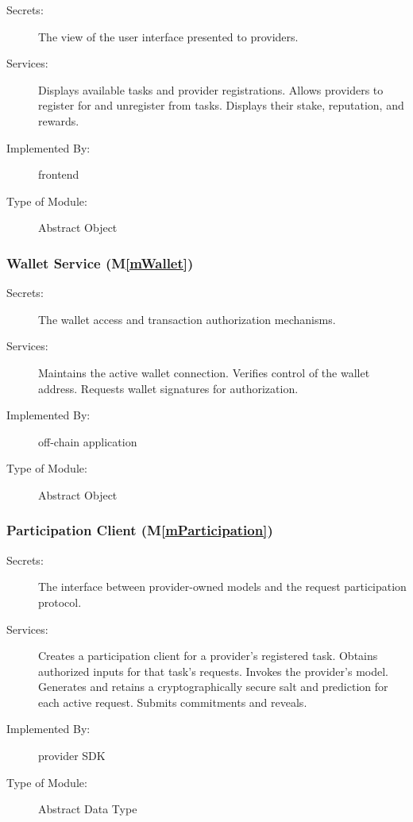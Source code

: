 \documentclass[12pt, titlepage]{article}
\newcommand{\mref}[1]{M\ref{#1}}
\begin{document}
\begin{description}
\item[Secrets:] The view of the user interface presented to providers.
\item[Services:] Displays available tasks and provider registrations. Allows
  providers to register for and unregister from tasks. Displays their stake,
  reputation, and rewards.
\item[Implemented By:] \progname{} frontend
\item[Type of Module:] Abstract Object
\end{description}

\subsubsection{Wallet Service (\mref{mWallet})}

\begin{description}
\item[Secrets:] The wallet access and transaction authorization mechanisms.
\item[Services:] Maintains the active wallet connection.
 Verifies control of the wallet address. Requests
  wallet signatures for authorization.
\item[Implemented By:] \progname{} off-chain application
\item[Type of Module:] Abstract Object
\end{description}

\subsubsection{Participation Client (\mref{mParticipation})}

\begin{description}
\item[Secrets:] The interface between provider-owned models and the request
  participation protocol.
\item[Services:] Creates a participation client for a provider's registered
  task. Obtains authorized inputs for that task's requests. Invokes the
  provider's model. Generates and retains a cryptographically secure salt and
  prediction for each active request. Submits commitments and reveals.
\item[Implemented By:] \progname{} provider SDK
\item[Type of Module:] Abstract Data Type
\end{description}
\end{document}
